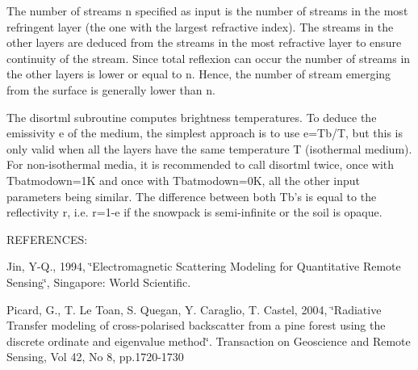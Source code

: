The number of streams n specified as input is the number of streams in the most refringent layer (the one with the largest refractive index). The streams in the other layers are deduced from the streams in the most refractive layer to ensure continuity of the stream. Since total reflexion can occur the number of streams in the other layers is lower or equal to n. Hence, the number of stream emerging from the surface is generally lower than n.

The disortml subroutine computes brightness temperatures. To deduce the emissivity e of the medium, the simplest approach is to use e=Tb/T, but this is only valid when all the layers have the same temperature T (isothermal medium). For non-\/isothermal media, it is recommended to call disortml twice, once with Tbatmodown=1K and once with Tbatmodown=0K, all the other input parameters being similar. The difference between both Tb's is equal to the reflectivity r, i.e. r=1-\/e if the snowpack is semi-\/infinite or the soil is opaque.

REFERENCES:

Jin, Y-\/Q., 1994, \char`\"{}Electromagnetic Scattering Modeling for Quantitative Remote Sensing\char`\"{}, Singapore: World Scientific.

Picard, G., T. Le Toan, S. Quegan, Y. Caraglio, T. Castel, 2004, \char`\"{}Radiative Transfer modeling of cross-\/polarised backscatter from 
 a pine forest using the discrete ordinate and eigenvalue method\char`\"{}. Transaction on Geoscience and Remote Sensing, Vol 42, No 8, pp.1720-\/1730


